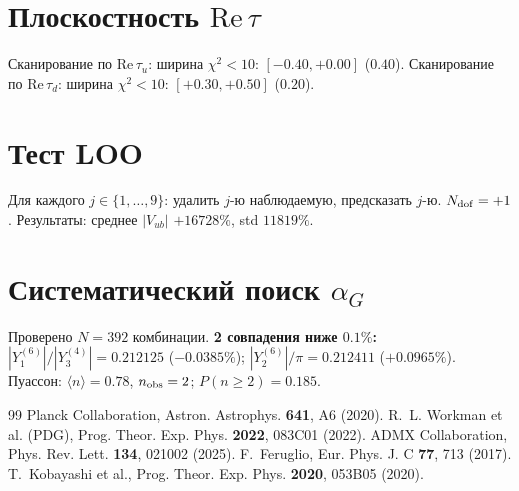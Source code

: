 \documentclass[12pt,a4paper]{article}
\numberwithin{equation}{section}
\begin{document}
\section{Плоскостность $\mathrm{Re}\,\tau$}
Сканирование по $\mathrm{Re}\,\tau_u$: ширина $\chi^2<10$: $[-0.40, +0.00]$ ($0.40$).
Сканирование по $\mathrm{Re}\,\tau_d$: ширина $\chi^2<10$: $[+0.30, +0.50]$ ($0.20$).

\section{Тест LOO}
Для каждого $j \in \{1,\ldots,9\}$: удалить $j$-ю наблюдаемую, предсказать $j$-ю. $N_{\rm dof} = +1$. Результаты: среднее $|V_{ub}|$ $+16728\%$, std $11819\%$.

\section{Систематический поиск $\alpha_G$}
Проверено $N = 392$ комбинации. \textbf{2 совпадения ниже $0.1\%$:}
$|Y^{(6)}_1|/|Y^{(4)}_3| = 0.212125$ ($-0.0385\%$);
$|Y^{(6)}_2|/\pi = 0.212411$ ($+0.0965\%$).
Пуассон: $\langle n\rangle = 0.78$, $n_{\rm obs} = 2$; $P(n \ge 2) = 0.185$.

\begin{thebibliography}{99}
 Planck Collaboration, Astron. Astrophys. \textbf{641}, A6 (2020).
 R.~L. Workman et al. (PDG), Prog. Theor. Exp. Phys. \textbf{2022}, 083C01 (2022).
 ADMX Collaboration, Phys. Rev. Lett. \textbf{134}, 021002 (2025).
 F.~Feruglio, Eur. Phys. J. C \textbf{77}, 713 (2017).
 T.~Kobayashi et al., Prog. Theor. Exp. Phys. \textbf{2020}, 053B05 (2020).
\end{thebibliography}
\end{document}
